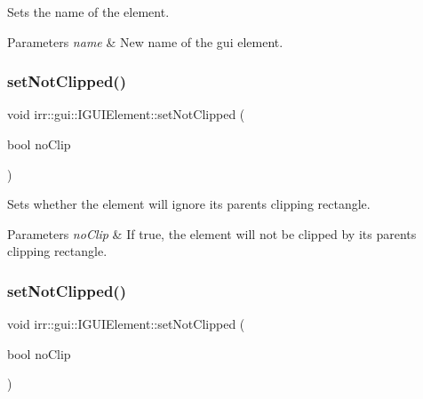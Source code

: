 Sets the name of the element. 


\begin{DoxyParams}{Parameters}
{\em name} & New name of the gui element. \\
\hline
\end{DoxyParams}
\mbox{\label{classirr_1_1gui_1_1IGUIElement_a814d322989acafa74c895e5c13908b86}} 
\subsubsection{\texorpdfstring{set\+Not\+Clipped()}{setNotClipped()}\hspace{0.1cm}{\footnotesize\ttfamily [1/2]}}
{\footnotesize\ttfamily void irr\+::gui\+::\+I\+G\+U\+I\+Element\+::set\+Not\+Clipped (\begin{DoxyParamCaption}\item[{bool}]{no\+Clip }\end{DoxyParamCaption})\hspace{0.3cm}{\ttfamily [inline]}}



Sets whether the element will ignore its parent\textquotesingle{}s clipping rectangle. 


\begin{DoxyParams}{Parameters}
{\em no\+Clip} & If true, the element will not be clipped by its parent\textquotesingle{}s clipping rectangle. \\
\hline
\end{DoxyParams}
\mbox{\label{classirr_1_1gui_1_1IGUIElement_a814d322989acafa74c895e5c13908b86}} 
\subsubsection{\texorpdfstring{set\+Not\+Clipped()}{setNotClipped()}\hspace{0.1cm}{\footnotesize\ttfamily [2/2]}}
{\footnotesize\ttfamily void irr\+::gui\+::\+I\+G\+U\+I\+Element\+::set\+Not\+Clipped (\begin{DoxyParamCaption}\item[{bool}]{no\+Clip }\end{DoxyParamCaption})\hspace{0.3cm}{\ttfamily [inline]}}



